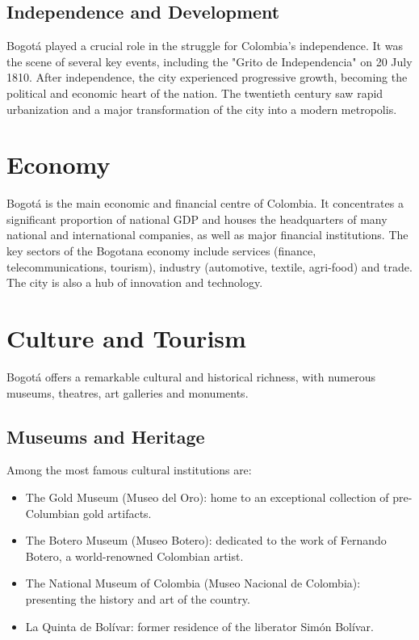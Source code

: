 \documentclass{article}
\begin{document}
\subsection{Independence and Development}
Bogotá played a crucial role in the struggle for Colombia's independence. It was the scene of several key events, including the "Grito de Independencia" on 20 July 1810. After independence, the city experienced progressive growth, becoming the political and economic heart of the nation. The twentieth century saw rapid urbanization and a major transformation of the city into a modern metropolis.

\section{Economy}
 Bogotá is the main economic and financial centre of Colombia. It concentrates a significant proportion of national GDP and houses the headquarters of many national and international companies, as well as major financial institutions. The key sectors of the Bogotana economy include services (finance, telecommunications, tourism), industry (automotive, textile, agri-food) and trade. The city is also a hub of innovation and technology.

\section{Culture and Tourism}
Bogotá offers a remarkable cultural and historical richness, with numerous museums, theatres, art galleries and monuments.

\subsection{Museums and Heritage}
Among the most famous cultural institutions are:
\begin{itemize}
    \item The Gold Museum (Museo del Oro): home to an exceptional collection of pre-Columbian gold artifacts.
    \item The Botero Museum (Museo Botero): dedicated to the work of Fernando Botero, a world-renowned Colombian artist.
    \item The National Museum of Colombia (Museo Nacional de Colombia): presenting the history and art of the country.
    \item La Quinta de Bolívar: former residence of the liberator Simón Bolívar.
\end{itemize}
\end{document}
